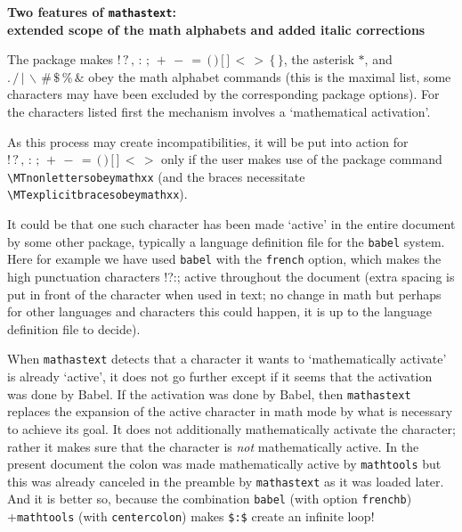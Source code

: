 \documentclass{article}
\begin{document}
\testfileincipit

\begin{center}
  \bfseries Two features of \texttt{mathastext}:\\
extended scope of the math alphabets and added italic corrections\par
\end{center}

The package makes
${!}\,{?}\,{,}\,{:}\,{;}\,{+}\,{-}\,{=}\,{(}\,{)}\,{[}\,{]}\,{<}\,{>}\,{\{}\,{\}}$,
the asterisk $*$, and $.\,/\,\vert\,\backslash\,{\#}\,{\$}\,{\%}\,{\&}$ obey the
math alphabet commands (this is the maximal list, some characters may have been
excluded by the corresponding package options). For the characters listed first
the mechanism involves a `mathematical activation'.

As this process may create incompatibilities, it will be put into action
for
${!}\,{?}\,{,}\,{:}\,{;}\,{+}\,{-}\,{=}\,{(}\,{)}\,{[}\,{]}\,{<}\,{>}$
only if the user makes use of the package command
\verb|\MTnonlettersobeymathxx| (and the braces necessitate
\verb|\MTexplicitbracesobeymathxx|).

It could be that one such character has been made `active' in the entire
document by some other package, typically a language definition file for the
\verb|babel| system. Here for example we have used \verb|babel| with the
\verb|french| option, which makes the high punctuation characters !?:; active
throughout the document (extra spacing is put in front of the character when
used in text; no change in math but perhaps for other languages and characters
this could happen, it is up to the language definition file to decide).

When \verb|mathastext| detects that a character it wants to `mathematically
activate' is already `active', it does not go further except if it seems that
the activation was done by Babel. If the activation was done by Babel, then
\verb|mathastext| replaces the expansion of the active character in math mode by
what is necessary to achieve its goal. It does not additionally mathematically
activate the character; rather it makes sure that the character is \emph{not}
mathematically active. In the present document the colon was made mathematically
active by \verb|mathtools| but this was already canceled in the preamble by
\verb|mathastext| as it was loaded later. And it is better so, because the
combination \verb|babel| (with option \verb|frenchb|) +\verb|mathtools| (with
\verb|centercolon|) makes \verb|$:$| create an infinite loop!
\end{document}
